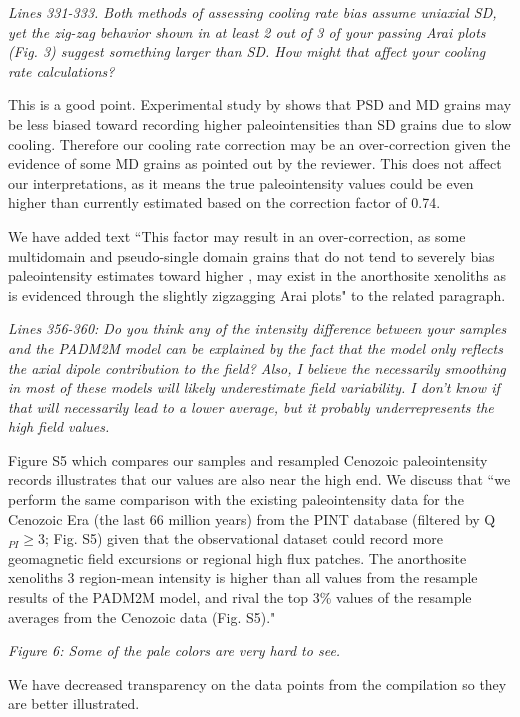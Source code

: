 \documentclass[11pt, letterpaper]{article}
\begin{document}
\begin{flushleft}
\textit{Lines 331-333. Both methods of assessing cooling rate bias assume uniaxial SD, yet the zig-zag behavior shown in at least 2 out of 3 of your passing Arai plots (Fig. 3) suggest something larger than SD. How might that affect your cooling rate calculations?}

This is a good point. Experimental study by \cite{Biggin2013a} shows that PSD and MD grains may be less biased toward recording higher paleointensities than SD grains due to slow cooling. Therefore our cooling rate correction may be an over-correction given the evidence of some MD grains as pointed out by the reviewer. This does not affect our interpretations, as it means the true paleointensity values could be even higher than currently estimated based on the correction factor of 0.74. 

We have added text ``This factor may result in an over-correction, as some multidomain and pseudo-single domain grains that do not tend to severely bias paleointensity estimates toward higher \cite{Biggin2013a}, may exist in the anorthosite xenoliths as is evidenced through the slightly zigzagging Arai plots" to the related paragraph. 

\textit{Lines 356-360: Do you think any of the intensity difference between your samples and the PADM2M model can be explained by the fact that the model only reflects the axial dipole contribution to the field? Also, I believe the necessarily smoothing in most of these models will likely underestimate field variability. I don't know if that will necessarily lead to a lower average, but it probably underrepresents the high field values.}

Figure S5 which compares our samples and resampled Cenozoic paleointensity records illustrates that our values are also near the high end. We discuss that ``we perform the same comparison with the existing paleointensity data for the Cenozoic Era (the last 66 million years) from the PINT database (filtered by Q$_{PI}\geq$3; Fig. S5) given that the observational dataset could record more geomagnetic field excursions or regional high flux patches. The anorthosite xenoliths 3 region-mean intensity is higher than all values from the resample results of the PADM2M model, and rival the top 3\% values of the resample averages from the Cenozoic data (Fig. S5)."

\textit{Figure 6: Some of the pale colors are very hard to see.}

We have decreased transparency on the data points from the compilation so they are better illustrated. 


\end{flushleft}
\end{document}

